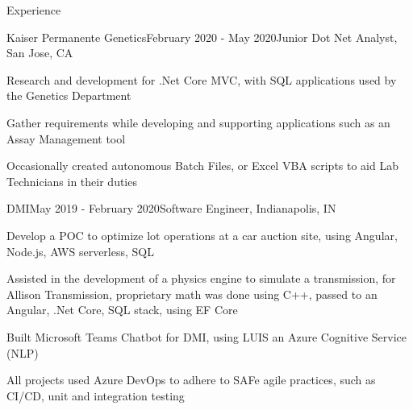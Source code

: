 \documentclass{resume} %
\begin{document}
\begin{rSection}{Experience}
\begin{rSubsection}{Kaiser Permanente Genetics}{February 2020 - May 2020}{Junior Dot Net Analyst, San Jose, CA}
\item Research and development for .Net Core MVC, with SQL applications used by the Genetics Department
\item Gather requirements while developing and supporting applications such as an Assay Management tool
\item Occasionally created autonomous Batch Files, or Excel VBA scripts to aid Lab Technicians in their duties
\end{rSubsection}
\begin{rSubsection}{DMI}{May 2019 - February 2020}{Software Engineer, Indianapolis, IN}

\item Develop a POC to optimize lot operations at a car auction site, using Angular, Node.js, AWS serverless, SQL
\item Assisted in the development of a physics engine to simulate a transmission, for Allison Transmission, proprietary math was done using C++, passed to an Angular, .Net Core, SQL stack, using EF Core
\item Built Microsoft Teams Chatbot for DMI, using LUIS an Azure Cognitive Service (NLP)
\item All projects used Azure DevOps to adhere to SAFe agile practices, such as CI/CD, unit and integration testing
\end{rSubsection}
\end{rSection}


\end{document}
